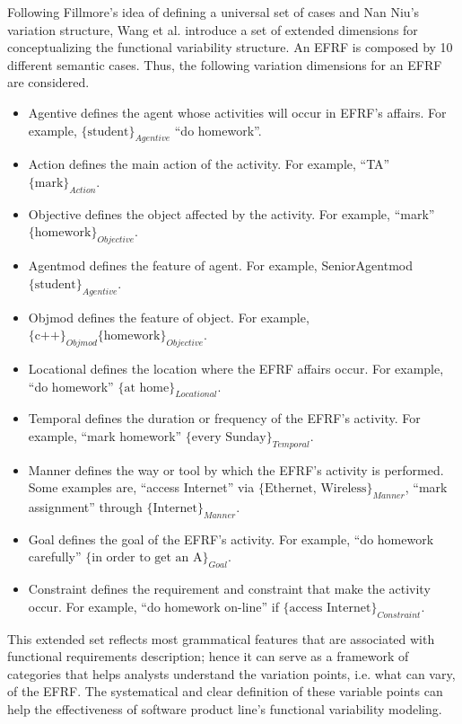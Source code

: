 \begin{multicols*}{2}
		Following Fillmore’s idea of defining a universal set of cases and Nan Niu’s variation structure, Wang et al. introduce a set of extended dimensions for conceptualizing the functional variability structure\cite{5381217}. An \gls{EFRF} is composed by 10 different semantic cases. Thus, the following variation dimensions for an \gls{EFRF} are considered.
		\begin{itemize}
			\item Agentive defines the agent whose activities will occur in \gls{EFRF}’s affairs. For example, $\{\mbox{student}\}_{Agentive}$
			“do homework”.
			\item Action defines the main action of the activity. For
			example, “TA” $\{\mbox{mark}\}_{Action}$.
			\item Objective defines the object affected by the activity.
			For example, “mark” $\{\mbox{homework}\}_{Objective}$.
			\item Agentmod defines the feature of agent. For example,
			{Senior}Agentmod $\{\mbox{student}\}_{Agentive}$.
			\item Objmod defines the feature of object. For example,
			$\{\mbox{c++}\}_{Objmod} \{\mbox{homework}\}_{Objective}$.
			 \item Locational defines the location where the \gls{EFRF} affairs occur. For example, “do homework” $\{\mbox{at home}\}_{Locational}$.
			 \item Temporal defines the duration or frequency of the
			 \gls{EFRF}’s activity. For example, “mark homework” $\{\mbox{every Sunday}\}_{Temporal}$.
			 \item  Manner defines the way or tool by which the
			 \gls{EFRF}’s activity is performed. Some examples are,
			 “access Internet” via $\{\mbox{Ethernet, Wireless}\}_{Manner}$,
			 “mark assignment” through $\{\mbox{Internet}\}_{Manner}$.
			 \item Goal defines the goal of the \gls{EFRF}’s activity. For example, “do homework carefully” $\{\mbox{in order to get an A}\}_{Goal}$.
			 \item Constraint defines the requirement and constraint
			 that make the activity occur. For example, “do
			 homework on-line” if $\{\mbox{access Internet}\}_{Constraint}$.
		\end{itemize}
		This extended set reflects most grammatical features
		that are associated with functional requirements description;
		hence it can serve as a framework of categories that helps
		analysts understand the variation points, i.e. what can vary,
		of the \gls{EFRF}. The systematical and clear definition of these
		variable points can help the effectiveness of software product line's functional variability modeling. 


\end{multicols*}

